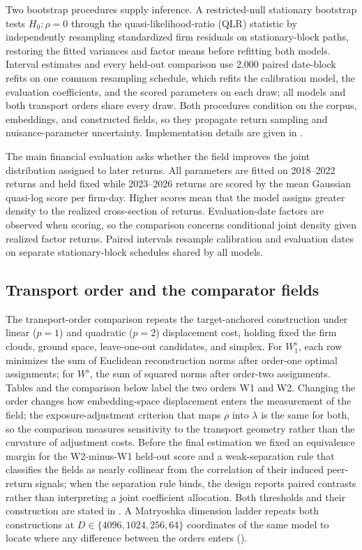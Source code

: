 Two bootstrap procedures supply inference. A restricted-null stationary
bootstrap tests $H_0:\rho=0$ through the quasi-likelihood-ratio (QLR) statistic
by independently resampling standardized firm residuals on stationary-block
paths, restoring the fitted variances and factor means before refitting both
models. Interval estimates and every held-out comparison use 2,000 paired
date-block refits on one common resampling schedule, which refits the
calibration model, the evaluation coefficients, and the scored parameters on
each draw; all models and both transport orders share every draw. Both
procedures condition on the corpus, embeddings, and constructed fields, so they
propagate return sampling and nuisance-parameter uncertainty. Implementation
details are given in .

The main financial evaluation asks whether the field improves the joint
distribution assigned to later returns.
All parameters are fitted on 2018--2022 returns and held fixed while 2023--2026
returns are scored by the mean Gaussian quasi-log score per firm-day.
Higher scores mean that the model assigns greater density to the realized
cross-section of returns.
Evaluation-date factors are observed when scoring, so the comparison concerns
conditional joint density given realized factor returns.
Paired intervals resample calibration and evaluation dates on separate
stationary-block schedules shared by all models.

\subsection{Transport order and the comparator fields}
\label{sec:two-field-estimation}

The transport-order comparison repeats the target-anchored construction under
linear ($p=1$) and quadratic ($p=2$) displacement cost, holding fixed the firm
clouds, ground space, leave-one-out candidates, and simplex.
For $W^\flat_1$, each row minimizes the sum of Euclidean reconstruction norms
after order-one optimal assignments; for $W^\flat$, the sum of squared norms
after order-two assignments.
Tables and the comparison below label the two orders W1 and W2.
Changing the order changes how embedding-space displacement enters the
measurement of the field; the exposure-adjustment criterion that maps $\rho$
into $\lambda$ is the same for both, so the comparison measures sensitivity to
the transport geometry rather than the curvature of adjustment costs.
Before the final estimation we fixed an equivalence margin for the
W2-minus-W1 held-out score and a weak-separation rule that classifies the
fields as nearly collinear from the correlation of their induced peer-return
signals; when the separation rule binds, the design reports paired contrasts
rather than interpreting a joint coefficient allocation. Both thresholds and
their construction are stated in .
A Matryoshka
dimension ladder repeats both constructions at
$D\in\{4096,1024,256,64\}$ coordinates of the same model
\citep{kusupati_matryoshka_2022,qwen3_embedding_2025} to locate where any
difference between the orders enters ().

